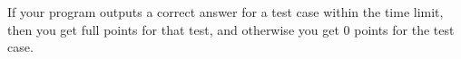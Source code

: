 If your program outputs a correct answer for a test case within the time limit, then you
get full points for that test, and otherwise you get $0$ points for the test case.